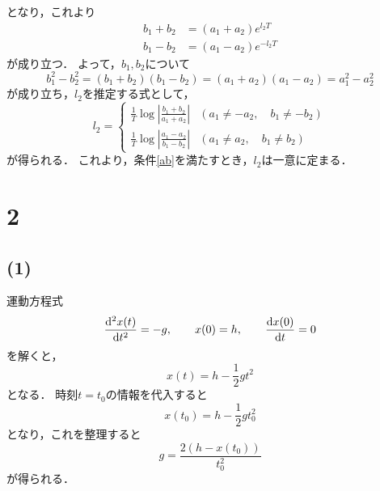 \documentclass[a4paper,11pt]{jsarticle}
\begin{document}
となり，これより
\begin{align}
  b_1 + b_2 &= (a_1 + a_2)e^{l_2 T} \\
  b_1 - b_2 &= (a_1 - a_2)e^{-l_2 T}
\end{align}
が成り立つ．
よって，$b_1,b_2$について
\begin{equation}
  b_1^2 - b_2^2 = (b_1+b_2)(b_1-b_2) = (a_1+a_2)(a_1-a_2) = a_1^2 - a_2^2 \label{ab}
\end{equation}
が成り立ち，$l_2$を推定する式として，
\begin{equation}
  l_2 = 
  \begin{cases}
    \frac{1}{T} \log{\left|\frac{b_1+b_2}{a_1+a_2}\right|} & (a_1\neq -a_2,\quad b_1\neq -b_2)\\
    \frac{1}{T} \log{\left|\frac{a_1-a_2}{b_1-b_2}\right|} & (a_1\neq a_2,\quad b_1\neq b_2)
  \end{cases}
\end{equation}
が得られる．
これより，条件\eqref{ab}を満たすとき，$l_2$は一意に定まる．

\section*{2}
\subsection*{(1)}
運動方程式
\begin{equation}
  \dv[2]{x(t)}{t} = -g,\qquad x(0)=h,\qquad \dv{x(0)}{t}=0
\end{equation}
を解くと，
\begin{equation}
  x(t) = h - \frac{1}{2}gt^2
\end{equation}
となる．
時刻$t=t_0$の情報を代入すると
\begin{equation}
  x(t_0) = h - \frac{1}{2}gt_0^2
\end{equation}
となり，これを整理すると
\begin{equation}
  g = \frac{2(h-x(t_0))}{t_0^2}
\end{equation}
が得られる．
\end{document}
